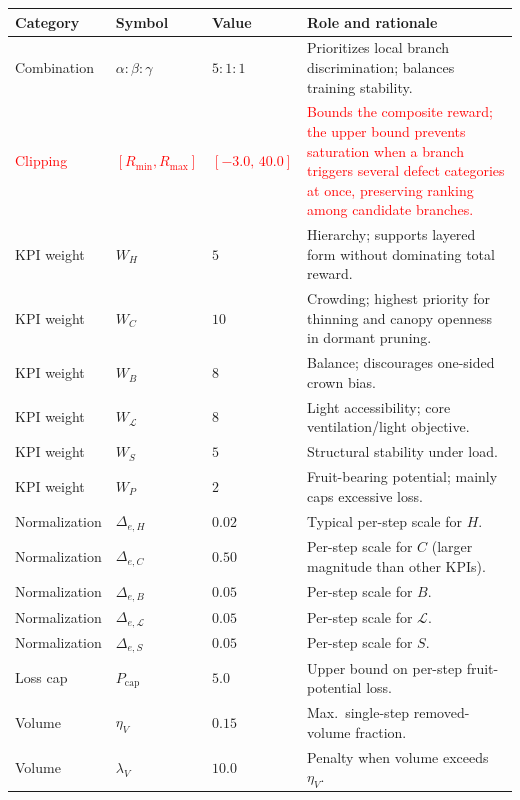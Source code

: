 \documentclass[12pt,a4paper,fontset=fandol]{ctexart}
\newcommand{\rev}[1]{\textcolor{red}{#1}}
\begin{document}
\begin{table}[H]
\centering
\small
\setlength{\tabcolsep}{5pt}
\renewcommand{\arraystretch}{1.15}
\begin{tabularx}{\textwidth}{>{\raggedright\arraybackslash}p{2.1cm}>{\raggedright\arraybackslash}p{2.7cm}>{\raggedright\arraybackslash}p{1.9cm}>{\raggedright\arraybackslash}X}
\toprule
\textbf{Category} & \textbf{Symbol} & \textbf{Value} & \textbf{Role and rationale} \\
\midrule
Combination & $\alpha:\beta:\gamma$ & $5:1:1$ & Prioritizes local branch discrimination; balances training stability. \\
\rev{Clipping} & \rev{$[R_{\min}, R_{\max}]$} & \rev{$[-3.0,\, 40.0]$} & \rev{Bounds the composite reward; the upper bound prevents saturation when a branch triggers several defect categories at once, preserving ranking among candidate branches.} \\
KPI weight & $W_H$ & $5$ & Hierarchy; supports layered form without dominating total reward. \\
KPI weight & $W_C$ & $10$ & Crowding; highest priority for thinning and canopy openness in dormant pruning. \\
KPI weight & $W_B$ & $8$ & Balance; discourages one-sided crown bias. \\
KPI weight & $W_{\mathcal{L}}$ & $8$ & Light accessibility; core ventilation/light objective. \\
KPI weight & $W_S$ & $5$ & Structural stability under load. \\
KPI weight & $W_P$ & $2$ & Fruit-bearing potential; mainly caps excessive loss. \\
Normalization & $\Delta_{e,H}$ & $0.02$ & Typical per-step scale for $H$. \\
Normalization & $\Delta_{e,C}$ & $0.50$ & Per-step scale for $C$ (larger magnitude than other KPIs). \\
Normalization & $\Delta_{e,B}$ & $0.05$ & Per-step scale for $B$. \\
Normalization & $\Delta_{e,\mathcal{L}}$ & $0.05$ & Per-step scale for $\mathcal{L}$. \\
Normalization & $\Delta_{e,S}$ & $0.05$ & Per-step scale for $S$. \\
Loss cap & $P_{\text{cap}}$ & $5.0$ & Upper bound on per-step fruit-potential loss. \\
Volume & $\eta_V$ & $0.15$ & Max.\ single-step removed-volume fraction. \\
Volume & $\lambda_V$ & $10.0$ & Penalty when volume exceeds $\eta_V$. \\

\end{tabularx}
\end{table}
\end{document}
